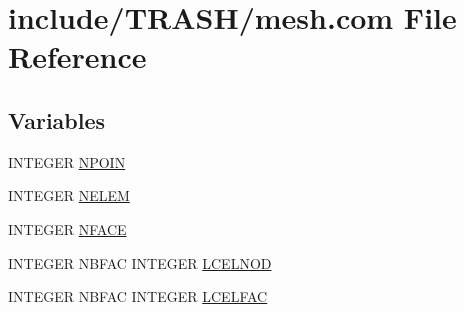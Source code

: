 \hypertarget{home_2abonfi_2_c_f_d__codes_2_eul_f_s_83_84_2include_2_t_r_a_s_h_2mesh_8com}{\section{include/\-T\-R\-A\-S\-H/mesh.com File Reference}
\label{home_2abonfi_2_c_f_d__codes_2_eul_f_s_83_84_2include_2_t_r_a_s_h_2mesh_8com}
}
\subsection*{Variables}
\begin{DoxyCompactItemize}
\item 
I\-N\-T\-E\-G\-E\-R \hyperlink{home_2abonfi_2_c_f_d__codes_2_eul_f_s_83_84_2include_2_t_r_a_s_h_2mesh_8com_ae28c1572321efcd8715b974d87d20c58}{N\-P\-O\-I\-N}
\item 
I\-N\-T\-E\-G\-E\-R \hyperlink{home_2abonfi_2_c_f_d__codes_2_eul_f_s_83_84_2include_2_t_r_a_s_h_2mesh_8com_aee5e75b79d0e815c0603cfbccc618957}{N\-E\-L\-E\-M}
\item 
I\-N\-T\-E\-G\-E\-R \hyperlink{home_2abonfi_2_c_f_d__codes_2_eul_f_s_83_84_2include_2_t_r_a_s_h_2mesh_8com_a78142d59d4cbb9fedbede16187658dd3}{N\-F\-A\-C\-E}
\item 
I\-N\-T\-E\-G\-E\-R N\-B\-F\-A\-C I\-N\-T\-E\-G\-E\-R \hyperlink{home_2abonfi_2_c_f_d__codes_2_eul_f_s_83_84_2include_2_t_r_a_s_h_2mesh_8com_ad60bfbd45e7524439e47beda45c898ef}{L\-C\-E\-L\-N\-O\-D}
\item 
I\-N\-T\-E\-G\-E\-R N\-B\-F\-A\-C I\-N\-T\-E\-G\-E\-R \hyperlink{home_2abonfi_2_c_f_d__codes_2_eul_f_s_83_84_2include_2_t_r_a_s_h_2mesh_8com_a1c18571472b5302b3a8ee29ece24bc40}{L\-C\-E\-L\-F\-A\-C}
\end{DoxyCompactItemize}


